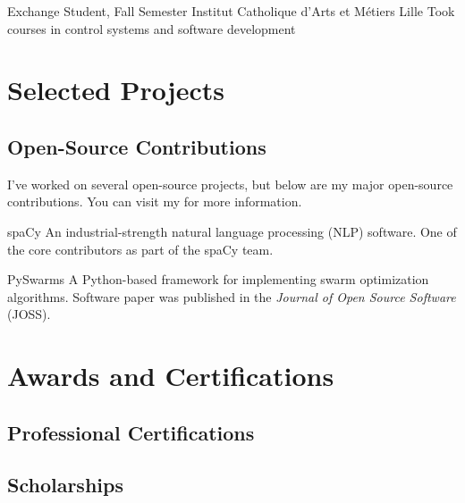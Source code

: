 \documentclass[12pt,a4paper]{moderncv}
\begin{document}
{Exchange Student, Fall Semester}
{Institut Catholique d'Arts et M\'etiers}
{Lille}{}
{Took courses in control systems and software development}

\section{Selected Projects}

\subsection{Open-Source Contributions}

I've worked on several open-source projects, but below are my major open-source
contributions. You can visit my {\color{blue}} for more information.


{\color{blue}
    }
{spaCy}{}{}
{
    An industrial-strength natural language processing (NLP) software. One of 
    the core contributors as part of the spaCy team.
}

{\color{blue} }
{PySwarms}{}{}
{
    A Python-based framework for implementing swarm optimization
    algorithms. Software paper was published in the \textit{Journal of Open
        Source Software} (JOSS).
}


\section{Awards and Certifications}

\subsection{Professional Certifications}

\subsection{Scholarships}


\nocite{*}


\end{document}
